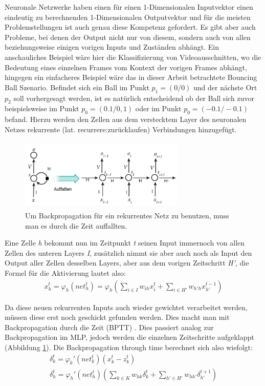 Neuronale Netzwerke haben einen für einen 1-Dimensionalen Inputvektor einen eindeutig zu berechnenden 1-Dimensionalen Outputvektor und für die meisten Problemstellungen ist auch genau diese Kompetenz gefordert. Es gibt aber auch Probleme, bei denen der Output nicht nur von diesem, sondern auch von allen beziehungsweise einigen vorigen Inputs und Zuständen abhängt. Ein anschauliches Beispiel wäre hier die Klassifizierung von Videoausschnitten, wo die Bedeutung eines einzelnen Frames vom Kontext der vorigen Frames abhängt, hingegen ein einfacheres Beispiel wäre das in dieser Arbeit betrachtete Bouncing Ball Szenario. Befindet sich ein Ball im Punkt \(p_{1}=(0/0)\) und der nächste Ort \(p_{2}\) soll vorhergesagt werden, ist es natürlich entscheidend ob der Ball sich zuvor beispielsweise im Punkt \(p_{0}=(0.1/0,1)\) oder im Punkt \(p_{0}=(-0.1/-0.1)\) befand. Hierzu werden den Zellen aus dem verstecktem Layer des neuronalen Netzes rekurrente (lat. recurrere:zurücklaufen) Verbindungen hinzugefügt.
\begin{figure}
	\centering
	\includegraphics[width=0.7\textwidth, height=130px]{pics/rnn.jpg}	
	\caption{Um Backpropagation für ein rekurrentes Netz zu benutzen, muss man es durch die Zeit auffallten. \cite{bib:rnn}}
	\label{img:rnn}
\end{figure}
Eine Zelle \textit{h} bekommt nun im Zeitpunkt \textit{t} seinen Input immernoch von allen Zellen des unteren Layers \textit{I}, zusätzlich nimmt sie aber auch noch als Input den Output aller Zellen desselben Layers, aber aus dem vorigen Zeitschritt \textit{H'}, die Formel für die Aktivierung lautet also: 
\begin{gather}
x^{t}_{h}=\varphi_{h}(net_{h}^{t})=\varphi_{h}(\sum_{i \in I}w_{ih}x^{t}_{i}+\sum_{i \in H'}w_{h'h}x^{t-1}_{h'})
\end{gather}

Da diese neuen rekurrenten Inputs auch wieder gewichtet verarbeitet werden, müssen diese erst noch geschickt gefunden werden. Dies macht man mit Backpropagation durch die Zeit (BPTT) \cite{bib:bptt}. Dies passiert analog zur Backpropagation im MLP, jedoch werden die einzelnen Zeitschritte aufgeklappt (Abbildung \ref{img:rnn}). Die Backpropagation through time berechnet sich also wiefolgt:
\begin{gather}
	\delta_{k}^{t} = \varphi_{k}'(net_{k}^{t})(x_{k}^{t}-z^{t}_{k}) \\
	\delta_{h}^{t} = \varphi_{h}'(net_{h}^{t})(\sum_{k \in K}w_{hk}\delta^{t}_{k}+\sum_{h' \in H'}w_{hh'}\delta^{t+1}_{h'})
\end{gather}

